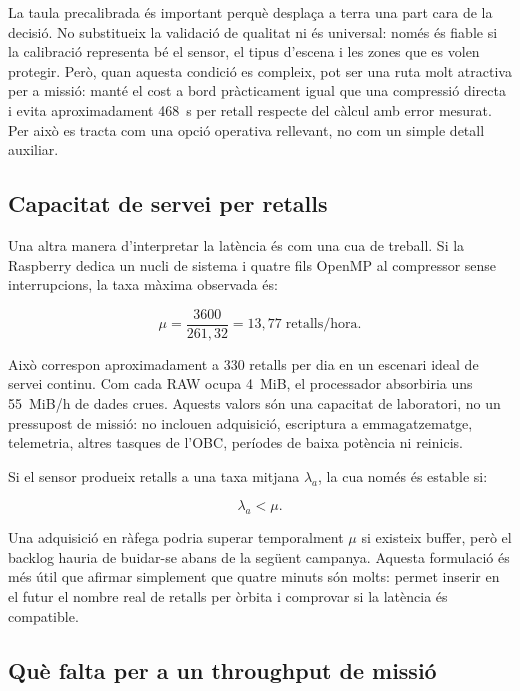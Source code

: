 La taula precalibrada és important perquè desplaça a terra una part cara de la
decisió. No substitueix la validació de qualitat ni és universal: només és
fiable si la calibració representa bé el sensor, el tipus d'escena i les zones
que es volen protegir. Però, quan aquesta condició es compleix, pot ser una ruta
molt atractiva per a missió: manté el cost a bord pràcticament igual que una
compressió directa i evita aproximadament 468~s per retall respecte del càlcul
amb error mesurat. Per això es tracta com una opció operativa rellevant, no com
un simple detall auxiliar.

\subsection{Capacitat de servei per retalls}

Una altra manera d'interpretar la latència és com una cua de treball. Si la
Raspberry dedica un nucli de sistema i quatre fils OpenMP al compressor sense
interrupcions, la taxa màxima observada és:

\begin{equation}
\mu=\frac{3600}{261,32}=13,77\;\text{retalls/hora}.
\end{equation}

Això correspon aproximadament a 330 retalls per dia en un escenari ideal de
servei continu. Com cada RAW ocupa 4~MiB, el processador absorbiria uns
55~MiB/h de dades crues. Aquests valors són una capacitat de laboratori, no un
pressupost de missió: no inclouen adquisició, escriptura a emmagatzematge,
telemetria, altres tasques de l'OBC, períodes de baixa potència ni reinicis.

Si el sensor produeix retalls a una taxa mitjana $\lambda_a$, la cua només és
estable si:

\begin{equation}
\lambda_a<\mu.
\end{equation}

Una adquisició en ràfega podria superar temporalment $\mu$ si existeix buffer,
però el backlog hauria de buidar-se abans de la següent campanya. Aquesta
formulació és més útil que afirmar simplement que quatre minuts són molts:
permet inserir en el futur el nombre real de retalls per òrbita i comprovar si
la latència és compatible.

\subsection{Què falta per a un throughput de missió}

